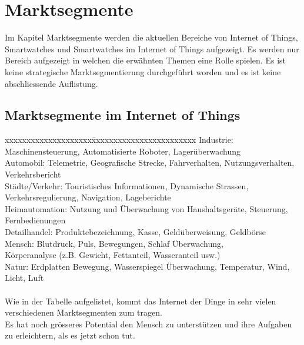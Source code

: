 \chapter{Marktsegmente}
Im Kapitel Marktsegmente werden die aktuellen Bereiche von Internet of Things, Smartwatches und Smartwatches im Internet of Things aufgezeigt. Es werden nur Bereich aufgezeigt in welchen die erwähnten Themen eine Rolle spielen. Es ist keine strategische Marktsegmentierung durchgeführt worden und es ist keine abschliessende Auflistung.

\section{Marktsegmente im Internet of Things}
\begin{tabbing}
xxxxxxxxxxxxxxxxxxxx\=xxxxxxxxxxxxxxxxxxxxxxxx	\kill
Industrie:  		 \>  Maschinensteuerung, Automatisierte Roboter, Lagerüberwachung \\
Automobil: 		   \>  Telemetrie, Geografische Strecke, Fahrverhalten, Nutzungsverhalten, Verkehrsbericht \\
Städte{/}Verkehr:\>  Touristisches Informationen, Dynamische Strassen, Verkehrsregulierung, Navigation, Lageberichte \\
Heimautomation:	 \>  Nutzung und Überwachung von Haushaltsgeräte, Steuerung, Fernbedienungen \\
Detailhandel:		 \>  Produktebezeichnung, Kasse, Geldüberweisung, Geldbörse \\
Mensch:          \>  Blutdruck, Puls, Bewegungen, Schlaf Überwachung, \\\>Körperanalyse {(z.B. Gewicht, Fettanteil, Wasseranteil usw.)} \\
Natur:			     \>  Erdplatten Bewegung, Wasserspiegel Überwachung, Temperatur, Wind, Licht, Luft \\\\

Wie in der Tabelle aufgelistet, kommt das Internet der Dinge in sehr vielen verschiedenen Marktsegmenten zum tragen.\\
Es hat noch grösseres Potential den Mensch zu unterstützen und ihre Aufgaben zu erleichtern, als es jetzt schon tut.
\end{tabbing}

